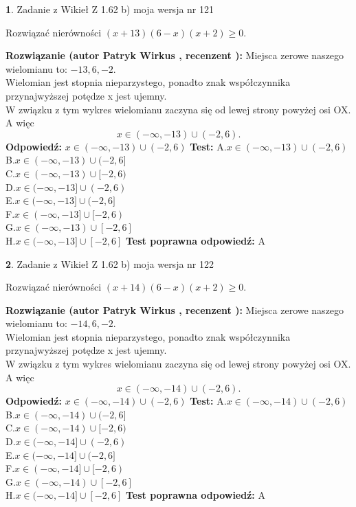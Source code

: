 \documentclass[12pt, a4paper]{article}
\theoremstyle{definition} %
\newtheorem{zad}{}
\newcommand{\zadStart}[1]{\begin{zad}#1\newline}
\newcommand{\zadStop}{\end{zad}}
\newcommand{\rozwStart}[2]{\noindent \textbf{Rozwiązanie (autor #1 , recenzent #2): }\newline}
\newcommand{\rozwStop}{\newline}
\newcommand{\odpStart}{\noindent \textbf{Odpowiedź:}\newline}
\newcommand{\odpStop}{\newline}
\newcommand{\testStart}{\noindent \textbf{Test:}\newline}
\newcommand{\testStop}{\newline}
\newcommand{\kluczStart}{\noindent \textbf{Test poprawna odpowiedź:}\newline}
\newcommand{\kluczStop}{\newline}
\begin{document}
\zadStart{Zadanie z Wikieł Z 1.62 b) moja wersja nr 121}

Rozwiązać nierówności $(x+13)(6-x)(x+2)\ge0$.
\zadStop
\rozwStart{Patryk Wirkus}{}
Miejsca zerowe naszego wielomianu to: $-13, 6, -2$.\\
Wielomian jest stopnia nieparzystego, ponadto znak współczynnika przy\linebreak najwyższej potędze x jest ujemny.\\ W związku z tym wykres wielomianu zaczyna się od lewej strony powyżej osi OX. A więc $$x \in (-\infty,-13) \cup (-2,6).$$
\rozwStop
\odpStart
$x \in (-\infty,-13) \cup (-2,6)$
\odpStop
\testStart
A.$x \in (-\infty,-13) \cup (-2,6)$\\
B.$x \in (-\infty,-13) \cup (-2,6]$\\
C.$x \in (-\infty,-13) \cup [-2,6)$\\
D.$x \in (-\infty,-13] \cup (-2,6)$\\
E.$x \in (-\infty,-13] \cup (-2,6]$\\
F.$x \in (-\infty,-13] \cup [-2,6)$\\
G.$x \in (-\infty,-13) \cup [-2,6]$\\
H.$x \in (-\infty,-13] \cup [-2,6]$
\testStop
\kluczStart
A
\kluczStop



\zadStart{Zadanie z Wikieł Z 1.62 b) moja wersja nr 122}

Rozwiązać nierówności $(x+14)(6-x)(x+2)\ge0$.
\zadStop
\rozwStart{Patryk Wirkus}{}
Miejsca zerowe naszego wielomianu to: $-14, 6, -2$.\\
Wielomian jest stopnia nieparzystego, ponadto znak współczynnika przy\linebreak najwyższej potędze x jest ujemny.\\ W związku z tym wykres wielomianu zaczyna się od lewej strony powyżej osi OX. A więc $$x \in (-\infty,-14) \cup (-2,6).$$
\rozwStop
\odpStart
$x \in (-\infty,-14) \cup (-2,6)$
\odpStop
\testStart
A.$x \in (-\infty,-14) \cup (-2,6)$\\
B.$x \in (-\infty,-14) \cup (-2,6]$\\
C.$x \in (-\infty,-14) \cup [-2,6)$\\
D.$x \in (-\infty,-14] \cup (-2,6)$\\
E.$x \in (-\infty,-14] \cup (-2,6]$\\
F.$x \in (-\infty,-14] \cup [-2,6)$\\
G.$x \in (-\infty,-14) \cup [-2,6]$\\
H.$x \in (-\infty,-14] \cup [-2,6]$
\testStop
\kluczStart
A
\kluczStop
\end{document}

